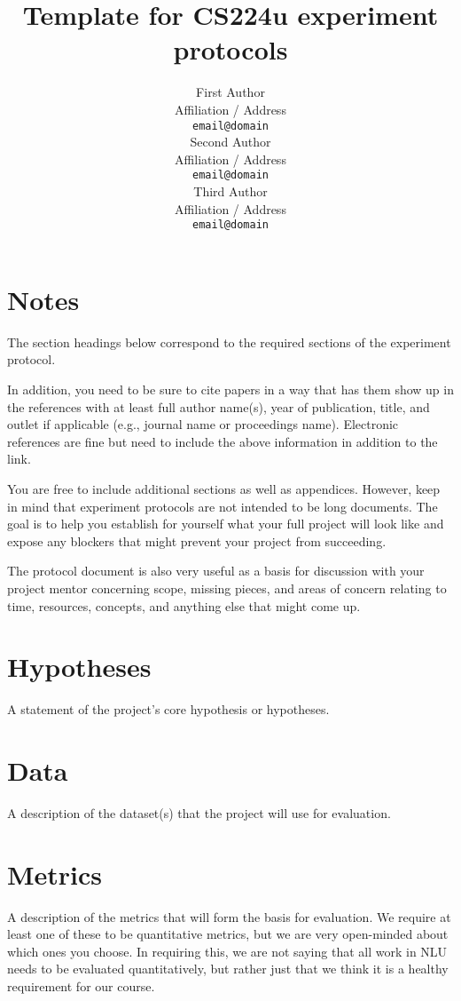 \documentclass[11pt]{article}
\title{Template for CS224u experiment protocols}
\author{First Author \\
  Affiliation / Address \\
  \texttt{email@domain} \\\And
  Second Author \\
  Affiliation / Address  \\  
  \texttt{email@domain} \\\And
  Third Author \\
  Affiliation / Address \\  
  \texttt{email@domain}
}
\begin{document}
\maketitle

\section*{Notes}

The section headings below correspond to the required sections of the experiment protocol. 

In addition, you need to be sure to cite papers in a way that has them show up in the references with at least full author name(s), year of publication, title, and outlet if applicable (e.g., journal name or proceedings name). Electronic references are fine but need to include the above information in addition to the link.

You are free to include additional sections as well as appendices. However, keep in mind that experiment protocols are not intended to be long documents. The goal is to help you establish for yourself what your full project will look like and expose any blockers that might prevent your project from succeeding. 

The protocol document is also very useful as a basis for discussion with your project mentor concerning scope, missing pieces, and areas of concern relating to time, resources, concepts, and anything else that might come up.

\section{Hypotheses} 

A statement of the project's core hypothesis or hypotheses.

\section{Data}

A description of the dataset(s) that the project will use for evaluation.

\section{Metrics} 

A description of the metrics that will form the basis for evaluation. We require at least one of these to be quantitative metrics, but we are very open-minded about which ones you choose. In requiring this, we are not saying that all work in NLU needs to be evaluated quantitatively, but rather just that we think it is a healthy requirement for our course.
\end{document}
